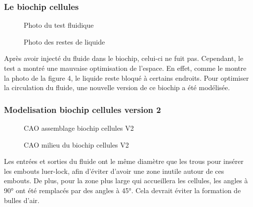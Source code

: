 \documentclass[a4paper, 11pt]{article}
\begin{document}
\subsubsection{Le biochip cellules}
\begin{multicols}{2}
    \begin{figure}[H]
        \centering
        \caption{Photo du test fluidique}
        \label{fig: fluide_cellules}
    \end{figure}
    \begin{figure}[H]
        \centering
        \caption{Photo des restes de liquide}
        \label{fig:reste_cellules}
    \end{figure}
\end{multicols}
Après avoir injecté du fluide dans le biochip, celui-ci ne fuit pas.
Cependant, le test a montré une mauvaise optimisation de l'espace.
En effet, comme le montre la photo de la figure 4, le liquide reste
bloqué à certains endroits. Pour optimiser la circulation du fluide,
une nouvelle version de ce biochip a été modélisée.
\newpage
\subsubsection{Modelisation biochip cellules version 2}
\begin{multicols}{2}
    \begin{figure}[H]
        \centering
        \caption{CAO assemblage biochip cellules V2}
        \label{fig: CAO_cellulesV2}
    \end{figure}
    \begin{figure}[H]
        \centering
        \caption{CAO milieu du biochip cellules V2}
        \label{fig:milieu_cellulesV2}
    \end{figure}
\end{multicols}
Les entrées et sorties du fluide ont le même diamètre que les trous pour insérer les embouts luer-lock, afin d'éviter d'avoir une zone inutile autour de ces embouts.
De plus, pour la zone plus large qui accueillera les cellules, les angles à 90° ont été remplacés par des angles à 45°. Cela devrait éviter la formation de bulles d'air.
\end{document}
